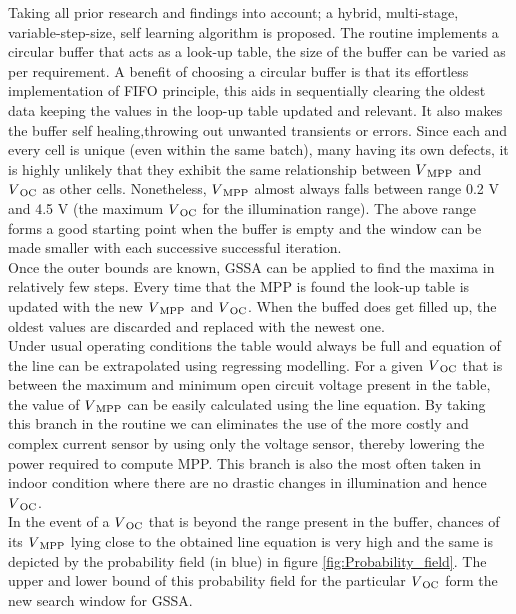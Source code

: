 Taking all prior research and findings into account; a hybrid, multi-stage, variable-step-size, self learning algorithm is proposed. The routine implements a circular buffer that acts as a look-up table, the size of the buffer can be varied as per requirement. A benefit of choosing a circular buffer is that its effortless implementation of \ac{FIFO} principle, this aids in sequentially clearing the oldest data keeping the values in the loop-up table updated and relevant. It also makes the buffer self healing,throwing out unwanted transients or errors. Since each and every cell is unique (even within the same batch), many having its own defects, it is highly unlikely that they exhibit the same relationship between $V\textsubscript{MPP}$ and $V\textsubscript{OC}$ as other cells. Nonetheless, $V\textsubscript{MPP}$ almost always falls between range 0.2 V and 4.5 V (the maximum $V\textsubscript{OC}$ for the illumination range). The above range forms a good starting point when the buffer is empty and the window can be made smaller with each successive successful iteration.\\

Once the outer bounds are known, \ac{GSSA} can be applied to find the maxima in relatively few steps. Every time that the \ac{MPP} is found the look-up table is updated with the new $V\textsubscript{MPP}$ and $V\textsubscript{OC}$. When the buffed does get filled up, the oldest values are discarded and replaced with the newest one.\\

 Under usual operating conditions the table would always be full and equation of the line can be extrapolated using regressing modelling. For a given $V\textsubscript{OC}$ that is between the maximum and minimum open circuit voltage present in the table, the value of $V\textsubscript{MPP}$ can be easily calculated using the line equation. By taking this branch in the routine we can eliminates the use of the more costly and complex current sensor \cite{urayai2011single} by using only the voltage sensor, thereby lowering the power required to compute \ac{MPP}. This branch is also the most often taken in indoor condition where there are no drastic changes in illumination and hence $V\textsubscript{OC}$.  \\  
         
 In the event of a $V\textsubscript{OC}$ that is beyond the range present in the buffer, chances of its $V\textsubscript{MPP}$ lying close to the obtained line equation is very high and the same is depicted by the probability field (in blue) in figure \ref{fig:Probability_field}. The upper and lower bound of this probability field for the particular $V\textsubscript{OC}$ form the new search window for \ac{GSSA}.\\
 
